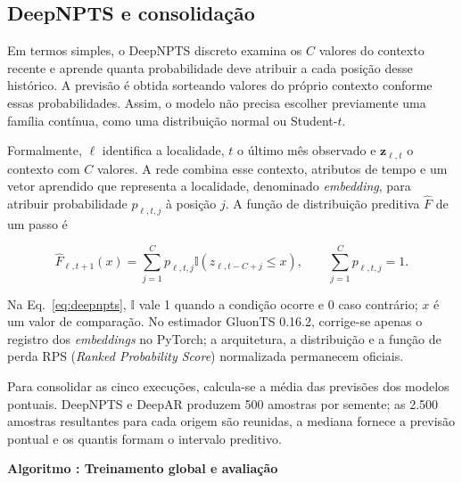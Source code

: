 \documentclass[12pt,a4paper,fleqn]{article}
\newcounter{algoritmo}
\begin{document}
\subsection{DeepNPTS e consolidação}

Em termos simples, o DeepNPTS discreto examina os $C$ valores do contexto recente e aprende quanta probabilidade deve atribuir a cada posição desse histórico. A previsão é obtida sorteando valores do próprio contexto conforme essas probabilidades. Assim, o modelo não precisa escolher previamente uma família contínua, como uma distribuição normal ou Student-$t$.

Formalmente, $\ell$ identifica a localidade, $t$ o último mês observado e $\mathbf z_{\ell,t}$ o contexto com $C$ valores. A rede combina esse contexto, atributos de tempo e um vetor aprendido que representa a localidade, denominado \textit{embedding}, para atribuir probabilidade $p_{\ell,t,j}$ à posição $j$. A função de distribuição preditiva $\widehat F$ de um passo é

\begin{equation}
 \widehat F_{\ell,t+1}(x)=\sum_{j=1}^{C}p_{\ell,t,j}
 \mathbb I(z_{\ell,t-C+j}\le x),\qquad \sum_{j=1}^{C}p_{\ell,t,j}=1.
 \label{eq:deepnpts}
\end{equation}

Na Eq.~\eqref{eq:deepnpts}, $\mathbb I$ vale 1 quando a condição ocorre e 0 caso contrário; $x$ é um valor de comparação. No estimador GluonTS 0.16.2, corrige-se apenas o registro dos \textit{embeddings} no PyTorch; a arquitetura, a distribuição e a função de perda RPS (\textit{Ranked Probability Score}) normalizada permanecem oficiais.

Para consolidar as cinco execuções, calcula-se a média das previsões dos modelos pontuais. DeepNPTS e DeepAR produzem 500 amostras por semente; as 2.500 amostras resultantes para cada origem são reunidas, a mediana fornece a previsão pontual e os quantis formam o intervalo preditivo.

\label{alg:sistema}
\noindent\textbf{Algoritmo \thealgoritmo: Treinamento global e avaliação}

\noindent{}
\end{document}
